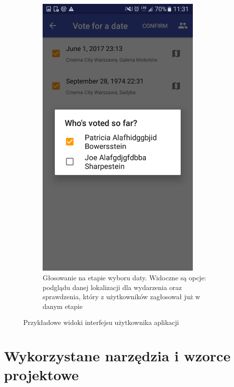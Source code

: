 \documentclass[10pt,a4paper]{article}
\begin{document}
\begin{figure}
\begin{subfigure}[t]{0.4\textwidth}
		\includegraphics[width=0.9\textwidth]{screen4.png}
		\caption{Głosowanie na etapie wyboru daty. Widoczne są opcje: podglądu danej lokalizacji
		dla wydarzenia oraz sprawdzenia, który z użytkowników zagłosował już w danym etapie}
	\end{subfigure}
	\caption{Przykładowe widoki interfejsu użytkownika aplikacji}
\end{figure}


\section{Wykorzystane narzędzia i wzorce projektowe}
\end{document}
